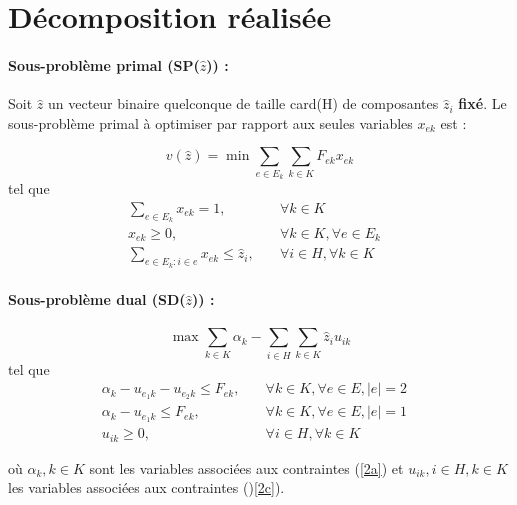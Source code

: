 \section{Décomposition réalisée}

\paragraph{Sous-problème primal (SP($\hat{z}$)) :}
Soit $\hat{z}$ un vecteur binaire quelconque de taille card(H) de composantes $\hat{z}_i$ \textbf{fixé}. Le sous-problème primal à optimiser par rapport aux seules variables $x_{ek}$ est : 

\[v(\hat{z}) =  \min \sum_{e \in E_k}\sum_{k \in K}F_{ek}x_{ek}\]
tel que
\begin{subequations}
    \begin{align}
        \sum_{e \in E_k}x_{ek} = 1, \quad &\forall{k\in K} \label{2a} &\\
        x_{ek} \ge 0, \quad &\forall{k \in K}, \forall{e \in E_k} \label{2b}&\\
        \sum_{e \in E_k:i\in e}x_{ek} \le \hat{z}_i,\quad &\forall{i \in H}, \forall{k\in K}\label{2c}
    \end{align}
\end{subequations}



\smallskip

\paragraph{Sous-problème dual (SD($\hat{z}$)) : } 

\[ \max \sum_{k \in K}\alpha_k - \sum_{i \in H}\sum_{k \in K} \hat{z}_iu_{ik}\]
tel que
\begin{subequations}
    \begin{align}
        \alpha_k - u_{e_1k} - u_{e_2k} \le F_{ek}, \quad &\forall{k\in K}, \forall{e \in E}, |e| = 2&\\
        \alpha_k - u_{e_1k} \le F_{ek}, \quad &\forall{k\in K}, \forall{e \in E}, |e| = 1&\\
        u_{ik} \ge 0, \quad &\forall{i \in H}, \forall{k \in K}
    \end{align}
\end{subequations}

où $\alpha_k, k\in K$ sont les variables associées aux contraintes (\ref{2a}) et $u_{ik}, i \in H, k \in K$ les variables associées aux contraintes ()\ref{2c}).



